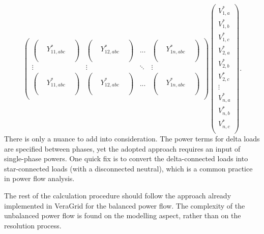 \documentclass[11pt]{article}
\begin{document}
\begin{equation}
\begin{pmatrix}
			\begin{pmatrix}
				 &  &  \\
				 & Y_{11,abc}^* &  \\
				 &  &  \\
			\end{pmatrix} &
			\begin{pmatrix}
				 &  &  \\
				 & Y_{12,abc}^* &  \\
				 &  &  \\
			\end{pmatrix} &
			...	 &
			\begin{pmatrix}
				 &  &  \\
				 & Y_{1n,abc}^* &  \\
				 &  &  \\
			\end{pmatrix} \\
			\vdots & \vdots & \ddots & \vdots \\
			\begin{pmatrix}
				 &  &  \\
				 & Y_{11,abc}^* &  \\
				 &  &  \\
			\end{pmatrix} &
			\begin{pmatrix}
				 &  &  \\
				 & Y_{12,abc}^* &  \\
				 &  &  \\
			\end{pmatrix} &
			...	&
			\begin{pmatrix}
				 &  &  \\
				 & Y_{1n,abc}^* &  \\
				 &  &  \\
			\end{pmatrix} \\
		\end{pmatrix}
		\begin{pmatrix}
			V_{1,a}^* \\
			V_{1,b}^* \\
			V_{1,c}^* \\
			V_{2,a}^* \\
			V_{2,b}^* \\
			V_{2,c}^* \\
			\vdots \\
			V_{n,a}^* \\
			V_{n,b}^* \\
			V_{n,c}^* \\
		\end{pmatrix}.
	\end{equation}
	There is only a nuance to add into consideration. The power terms for delta loads are specified between phases, yet the adopted approach requires an input of single-phase powers. One quick fix is to convert the delta-connected loads into star-connected loads (with a disconnected neutral), which is a common practice in power flow analysis.

	The rest of the calculation procedure should follow the approach already implemented in VeraGrid for the balanced power flow. The complexity of the unbalanced power flow is found on the modelling aspect, rather than on the resolution process.


	
	\printbibliography
	
\end{document}

